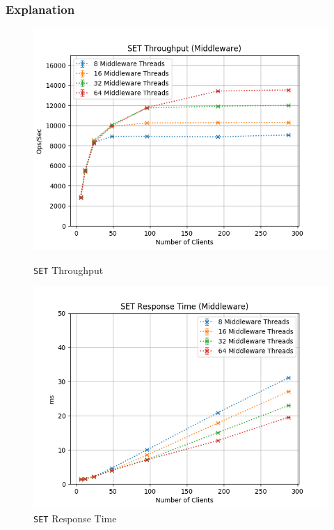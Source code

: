 \documentclass[11pt,a4paper]{article}
\begin{document}
\subsubsection{Explanation}
%
\begin{figure}[H]
	\centering
    \begin{minipage}{0.5\textwidth}
        \centering
        \includegraphics[width=\textwidth]{../illustrations/plots/3_1_full_system_write/1-0/middleware_set_tp_s.png}
        \caption{\texttt{SET} Throughput}
        \label{fig:full_system_write_set_tp_mw}
    \end{minipage}\hfill
    \begin{minipage}{0.5\textwidth}
        \centering
        \includegraphics[width=\textwidth]{../illustrations/plots/3_1_full_system_write/1-0/middleware_set_rt_ms.png}
        \caption{\texttt{SET} Response Time}
        \label{fig:full_system_write_set_rt_mw}
    \end{minipage}
\end{figure}
\end{document}
